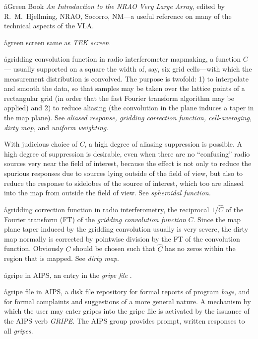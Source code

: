 \aa{Green Book}
{\it An Introduction to the NRAO Very Large Array},
edited by R.~M.~Hjellming, NRAO, Socorro, NM---a useful
reference on many of the technical aspects of the VLA.

\aa{green screen} same as {\it TEK screen}.

\aa{gridding convolution function}
in radio interferometer mapmaking, a function $C$---%
usually supported on a square the width of, say,
six \uv grid cells---with which the \uv measurement distribution
is convolved.
The purpose is twofold: 1) to interpolate and smooth the data, so that
samples may be taken over the lattice points of a rectangular grid
(in order that the fast Fourier transform algorithm may be applied)
and 2) to reduce aliasing (the convolution in the \uv
plane induces a taper in the map plane).
See {\it aliased response, gridding correction function, cell-averaging,
dirty map,} and {\it uniform weighting}.
\par
With judicious choice of $C$, a high degree of aliasing
suppression is possible.
A high degree of suppression is desirable, even when there
are no ``confusing'' radio sources very near the field of interest,
because the effect is not only to reduce the spurious responses due to
sources lying outside of the field of view, but also to
reduce the response to sidelobes of the source of
interest, which too are aliased into the map from outside the
field of view.
See {\it spheroidal function.}

\aa{gridding correction function}
in radio interferometry,
the reciprocal $1/\hat C$ of the Fourier transform (FT)
of the {\it gridding convolution function} $C$.
Since the map plane taper induced by the gridding convolution
usually is very severe, the dirty map normally is corrected
by pointwise division by the FT of the convolution function.
Obviously $C$ should be chosen such that $\hat C$ has no zeros
within the region that is mapped.
See {\it dirty map}.

\aa{gripe}
in AIPS, an entry in the {\it gripe file} \qv.

\aa{gripe file}
in AIPS, a disk file repository for formal reports
of program {\it bugs}, and for formal complaints and
suggestions of a more general nature.
A mechanism by which the user may enter gripes into the gripe file
is activated by the issuance of the AIPS verb {\sl GRIPE}.
The AIPS group provides prompt, written responses to all {\it gripes}.

